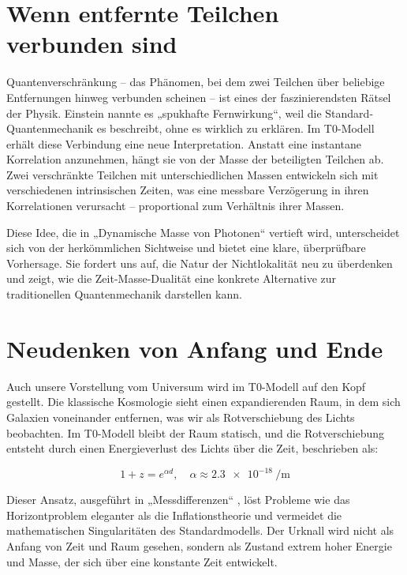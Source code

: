 \documentclass[a4paper,12pt]{article}
\begin{document}
	\section{Wenn entfernte Teilchen verbunden sind}
	
	Quantenverschränkung – das Phänomen, bei dem zwei Teilchen über beliebige Entfernungen hinweg verbunden scheinen – ist eines der faszinierendsten Rätsel der Physik. Einstein nannte es „spukhafte Fernwirkung“, weil die Standard-Quantenmechanik es beschreibt, ohne es wirklich zu erklären. Im T0-Modell erhält diese Verbindung eine neue Interpretation. Anstatt eine instantane Korrelation anzunehmen, hängt sie von der Masse der beteiligten Teilchen ab. Zwei verschränkte Teilchen mit unterschiedlichen Massen entwickeln sich mit verschiedenen intrinsischen Zeiten, was eine messbare Verzögerung in ihren Korrelationen verursacht – proportional zum Verhältnis ihrer Massen.
	
	Diese Idee, die in „Dynamische Masse von Photonen“ \cite{pascher_photons_2025} vertieft wird, unterscheidet sich von der herkömmlichen Sichtweise und bietet eine klare, überprüfbare Vorhersage. Sie fordert uns auf, die Natur der Nichtlokalität neu zu überdenken und zeigt, wie die Zeit-Masse-Dualität eine konkrete Alternative zur traditionellen Quantenmechanik darstellen kann.
	
	\section{Neudenken von Anfang und Ende}
	
	Auch unsere Vorstellung vom Universum wird im T0-Modell auf den Kopf gestellt. Die klassische Kosmologie sieht einen expandierenden Raum, in dem sich Galaxien voneinander entfernen, was wir als Rotverschiebung des Lichts beobachten. Im T0-Modell bleibt der Raum statisch, und die Rotverschiebung entsteht durch einen Energieverlust des Lichts über die Zeit, beschrieben als:
	
	\begin{equation}
		1 + z = e^{\alpha d}, \quad \alpha \approx \SI{2.3e-18}{\per\meter}
	\end{equation}
	
	Dieser Ansatz, ausgeführt in „Messdifferenzen“ \cite{pascher_messdifferenzen_2025}, löst Probleme wie das Horizontproblem eleganter als die Inflationstheorie und vermeidet die mathematischen Singularitäten des Standardmodells. Der Urknall wird nicht als Anfang von Zeit und Raum gesehen, sondern als Zustand extrem hoher Energie und Masse, der sich über eine konstante Zeit entwickelt.
	
\end{document}
